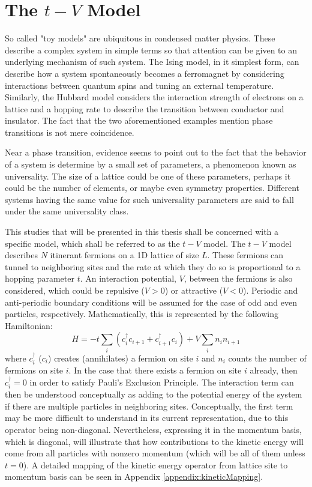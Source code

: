 \section{The $t-V$ Model}
\label{sec:t-VIntro}

So called "toy models" are ubiquitous in condensed matter physics. These describe a complex system in simple terms so that attention can be given to an underlying mechanism of such system. The Ising model, in it simplest form, can describe how a system spontaneously becomes a ferromagnet by considering interactions between quantum spins and tuning an external temperature. Similarly, the Hubbard model considers the interaction strength of electrons on a lattice and a hopping rate to describe the transition between conductor and insulator. The fact that the two aforementioned examples mention phase transitions is not mere coincidence. 

Near a phase transition, evidence seems to point out to the fact that the behavior of a system is determine by a small set of parameters, a phenomenon known as universality. The size of a lattice could be one of these parameters, perhaps it could be the number of elements, or maybe even symmetry properties. Different systems having the same value for such universality parameters are said to fall under the same universality class. 

This studies that will be presented in this thesis shall be concerned with a specific model, which shall be referred to as the $t-V$ model. The $t-V$ model describes $N$ itinerant fermions on a 1D lattice of size $L$. These fermions can tunnel to neighboring sites and the rate at which they do so is proportional to a hopping parameter $t$. An interaction potential, $V$, between the fermions is also considered, which could be repulsive ($V > 0$) or attractive ($V < 0$). Periodic and anti-periodic boundary conditions will be assumed for the case of odd and even particles, respectively. Mathematically, this is represented by the following Hamiltonian:
%
\begin{equation}
H = -t \sum_{i} \left ( c_{i}^{\dag} c_{i+1} + c_{i+1}^{\dag} c_{i} \right )+ V \sum_{i} n_i n_{i+1}   
\label{eq:t-VHamiltonian}
\end{equation}
%
where $c_{i}^{\dag}$ ($c_{i}$) creates (annihilates) a fermion on site $i$ and $n_{i}$ counts the number of fermions on site $i$. In the case that there exists a fermion on site $i$ already, then $c_{i}^{\dag} = 0$ in order to satisfy Pauli's Exclusion Principle. The interaction term can then be understood conceptually as adding to the potential energy of the system if there are multiple particles in neighboring sites. Conceptually, the first term may be more difficult to understand in its current representation, due to this operator being non-diagonal. Nevertheless, expressing it in the momentum basis, which is diagonal, will illustrate that how contributions to the kinetic energy will come from all particles with nonzero momentum (which will be all of them unless $t=0$). A detailed mapping of the kinetic energy operator from lattice site to momentum basis can be seen in Appendix \ref{appendix:kineticMapping}.


